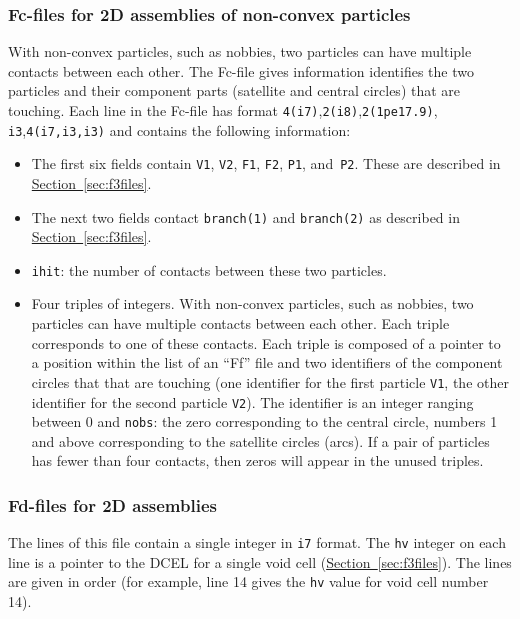 \documentclass[letterpaper,11pt]{article}
\begin{document}
\subsubsection{Fc-files for 2D assemblies of non-convex particles}\label{sec:f3files2}
With non-convex particles, such as nobbies,
two particles can have multiple contacts between each other.
The Fc-file gives information identifies the two particles and their
component parts (satellite and central circles) that are touching.
Each line in the Fc-file has format
\texttt{4(i7)},\texttt{2(i8)},\texttt{2(1pe17.9)},
\texttt{i3},\texttt{4(i7,i3,i3)}
and contains the following information:
\begin{itemize}
\item
The first six fields contain \texttt{V1}, \texttt{V2}, \texttt{F1}, \texttt{F2}, \texttt{P1},
and~\texttt{P2}.
These are described in
\hyperref[sec:f3files]{Section~\ref*{sec:f3files}}.
\item
The next two fields contact \texttt{branch(1)} and \texttt{branch(2)}
as described in
\hyperref[sec:f3files]{Section~\ref*{sec:f3files}}.
\item
\texttt{ihit}: the number of contacts between these two particles.
\item
Four triples of integers.  With non-convex particles, such as nobbies,
two particles can have multiple contacts between each other.
Each triple corresponds to one of these contacts.
Each triple is composed of a pointer to
a position within the list of an ``Ff'' file and two identifiers
of the component circles that that are touching (one identifier for
the first particle \texttt{V1}, the other identifier for the
second particle \texttt{V2}).
The identifier is an integer ranging between 0 and \texttt{nobs}:
the zero corresponding to the central circle, numbers 1 and above
corresponding to the satellite circles (arcs).
If a pair of particles has fewer than four contacts, then
zeros will appear in the unused triples.
\end{itemize}
%
\subsubsection{Fd-files for 2D assemblies}\label{sec:f4files}
The lines of this file contain a single integer
in \texttt{i7} format.  The \texttt{hv} integer on 
each line is a pointer to the DCEL for a single void cell
(\hyperref[sec:f3files]{Section~\ref*{sec:f3files}}).
The lines are given in order (for example,
line 14 gives the \texttt{hv} value for void cell number 14).
%
\end{document}
